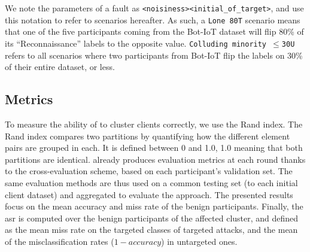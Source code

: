 We note the parameters of a fault as \verb|<noisiness><initial_of_target>|, and use this notation to refer to scenarios hereafter.
As  such, a \texttt{Lone 80T} scenario means that one of the five participants coming from the Bot-IoT dataset will flip 80\% of its ``Reconnaissance'' labels to the opposite value.
\texttt{Colluding minority $\leq$30U} refers to all scenarios where two participants from Bot-IoT flip the labels on 30\% of their entire dataset, or less.


\subsection{Metrics\label{sec:radar.methodo.metrics}}

To measure the ability of \thecontrib to cluster clients correctly, we use the Rand index. 
The Rand index compares two partitions by quantifying how the different element pairs are grouped in each.
It is defined between 0 and 1.0, 1.0 meaning that both partitions are identical.
\thecontrib already produces evaluation metrics at each round thanks to the cross-evaluation scheme, based on each participant's validation set.
The same evaluation methods are thus used on a common testing set (to each initial client dataset) and aggregated to evaluate the approach.
The presented results focus on the mean accuracy and miss rate of the benign participants.
Finally, the \gls{asr} is computed over the benign participants of the affected cluster, and defined as the mean miss rate on the targeted classes of targeted attacks, and the mean of the misclassification rates (\ie $1-accuracy$) in untargeted ones.

